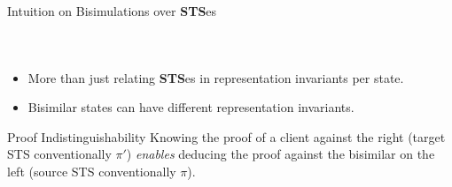\documentclass[aspectratio=169,xcolor=dvipsnames]{beamer}
\begin{document}
\begin{frame}{Intuition on Bisimulations over \textbf{STS}es}
\begin{columns}[c]
\begin{figure}
    \label{fig:enter-label}
    \end{figure}
\end{columns}
\begin{itemize}
    \item More than just relating \textbf{STS}es in representation invariants per state.
    \item Bisimilar states can have different representation invariants.
    \end{itemize}
    \begin{alertblock}{Proof Indistinguishability}
        Knowing the proof of a client against the right (target STS conventionally $\pi'$)  \emph{enables} deducing the proof against the bisimilar on the left (source STS conventionally $\pi$).
    \end{alertblock}   
\end{frame}
\end{document}

